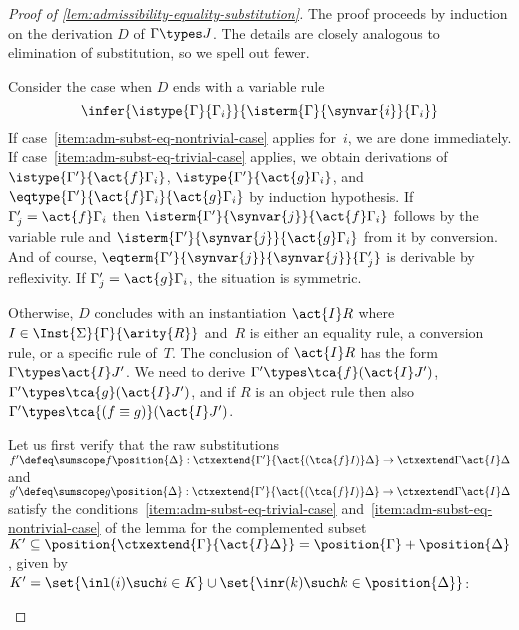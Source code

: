 \begin{proof}[Proof of \cref{lem:admissibility-equality-substitution}]
  The proof proceeds by induction on the derivation $D$ of $\Gamma \types J$.
  The details are closely analogous to elimination of substitution, so we spell out fewer.

  Consider the case when $D$ ends with a variable rule
  \begin{equation*}
    \infer{
      \istype{\Gamma}{\Gamma_i}
    }{
      \isterm{\Gamma}{\synvar{i}}{\Gamma_i}
    }
  \end{equation*}
  If case~\eqref{item:adm-subst-eq-nontrivial-case} applies for~$i$, we are done immediately.
  If case~\eqref{item:adm-subst-eq-trivial-case} applies, we obtain derivations of $\istype{\Gamma'}{\act{f} \Gamma_i}$, $\istype{\Gamma'}{\act{g} \Gamma_i}$, and $\eqtype{\Gamma'}{\act{f} \Gamma_i}{\act{g} \Gamma_i}$ by induction hypothesis.
  If $\Gamma'_j = \act{f} \Gamma_i$ then $\isterm{\Gamma'}{\synvar{j}}{\act{f} \Gamma_i}$ follows by the variable rule and $\isterm{\Gamma'}{\synvar{j}}{\act{g} \Gamma_i}$ from it by conversion. And of course, $\eqterm{\Gamma'}{\synvar{j}}{\synvar{j}}{\Gamma'_j}$ is derivable by reflexivity. If $\Gamma'_j = \act{g} \Gamma_i$, the situation is symmetric.

  Otherwise, $D$ concludes with an instantiation $\act{I} R$ where $I \in \Inst{\Sigma}{\Gamma}{\arity{R}}$ and~$R$ is either an equality rule, a conversion rule, or a specific rule of~$T$. The conclusion of $\act{I} R$ has the form $\Gamma \types \act{I} J'$.
  We need to derive $\Gamma' \types \tca{f} (\act{I} J')$, $\Gamma' \types \tca{g} (\act{I} J')$, and if $R$ is an object rule then also $\Gamma' \types \tca{(f \equiv g)} (\act{I} J')$.

  Let us first verify that the raw substitutions $f' \defeq \sumscope f {\position{\Delta}} : \ctxextend {\Gamma'}{\act{(\tca{f} I)} \Delta} \to \ctxextend \Gamma {\act{I} \Delta}$ and $g' \defeq \sumscope g {\position{\Delta}} : \ctxextend {\Gamma'}{\act{(\tca{f} I)} \Delta} \to \ctxextend \Gamma {\act{I} \Delta}$ satisfy the conditions~\eqref{item:adm-subst-eq-trivial-case} and~\eqref{item:adm-subst-eq-nontrivial-case} of the lemma for the complemented subset $K' \subseteq \position{\ctxextend{\Gamma}{\act{I} \Delta}} = \position{\Gamma} + \position{\Delta}$, given by
  $
    K' = \set{\inl(i) \such i \in K} \cup \set{\inr(k) \such k \in \position{\Delta}}
  $:
  \begin{enumerate}


\end{enumerate}
\end{proof}
